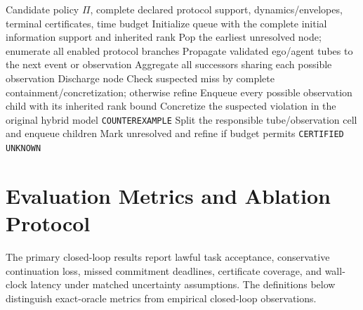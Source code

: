 \documentclass[letterpaper]{article} %
\begin{document}
\begin{algorithm}[t]
\footnotesize
\caption{Full-support tube verification with counterexample-guided refinement}
\label{alg:full-verifier}
\begin{algorithmic}[1]
\Require Candidate policy $\Pi$, complete declared protocol support, dynamics/envelopes, terminal certificates, time budget
\State Initialize queue with the complete initial information support and inherited rank
  \State Pop the earliest unresolved node; enumerate all enabled protocol branches
  \State Propagate validated ego/agent tubes to the next event or observation
    \State Aggregate all successors sharing each possible observation
        \State Discharge node
      \Else
        \State Check suspected miss by complete containment/concretization; otherwise refine
      \EndIf
    \Else
      \State Enqueue every possible observation child with its inherited rank bound
    \EndIf
  \Else
    \State Concretize the suspected violation in the original hybrid model
     \State \Return \texttt{COUNTEREXAMPLE}
     \State Split the responsible tube/observation cell and enqueue children
    \Else \State Mark unresolved and refine if budget permits
    \EndIf
  \EndIf
\EndWhile
{} \State \Return \texttt{CERTIFIED}
\Else \State \Return \texttt{UNKNOWN} \EndIf
\end{algorithmic}
\end{algorithm}

\section{Evaluation Metrics and Ablation Protocol}
\label{app:eval}
The primary closed-loop results report lawful task acceptance, conservative continuation loss, missed commitment deadlines, certificate coverage, and wall-clock latency under matched uncertainty assumptions. The definitions below distinguish exact-oracle metrics from empirical closed-loop observations.
\end{document}
